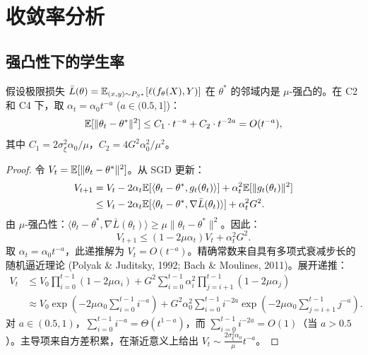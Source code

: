 \section{收敛率分析}\label{sec:rates}

\subsection{强凸性下的学生率}

\begin{theorem}[强凸性下的学生收敛率]\label{thm:rate-student}
假设极限损失 $\bar{L}(\theta) = \mathbb{E}_{(x,y) \sim P_{S^*}}[\ell(f_\theta(X), Y)]$ 在 $\theta^*$ 的邻域内是 $\mu$-强凸的。在 C2 和 C4 下，取 $\alpha_t = \alpha_0 t^{-a}$ ($a \in (0.5, 1]$)：
\begin{equation}
    \mathbb{E}[\|\theta_t - \theta^*\|^2] \leq C_1 \cdot t^{-a} + C_2 \cdot t^{-2a} = O(t^{-a}),
\end{equation}
其中 $C_1 = 2\sigma_\xi^2 \alpha_0 / \mu$，$C_2 = 4 G^2 \alpha_0^2 / \mu^2$。
\end{theorem}

\begin{proof}
令 $V_t = \mathbb{E}[\|\theta_t - \theta^*\|^2]$。从 SGD 更新：
\begin{align}
    V_{t+1} &= V_t - 2\alpha_t \mathbb{E}[\langle \theta_t - \theta^*, g_t(\theta_t) \rangle] + \alpha_t^2 \mathbb{E}[\|g_t(\theta_t)\|^2] \\
    &\leq V_t - 2\alpha_t \mathbb{E}[\langle \theta_t - \theta^*, \nabla \bar{L}(\theta_t) \rangle] + \alpha_t^2 G^2.
\end{align}
由 $\mu$-强凸性：$\langle \theta_t - \theta^*, \nabla \bar{L}(\theta_t) \rangle \geq \mu \|\theta_t - \theta^*\|^2$。因此：
\begin{equation}
    V_{t+1} \leq (1 - 2\mu\alpha_t) V_t + \alpha_t^2 G^2.
\end{equation}
取 $\alpha_t = \alpha_0 t^{-a}$，此递推解为 $V_t = O(t^{-a})$。精确常数来自具有多项式衰减步长的随机逼近理论 (Polyak \& Juditsky, 1992; Bach \& Moulines, 2011)。展开递推：
\begin{align}
    V_t &\leq V_0 \prod_{i=0}^{t-1} (1 - 2\mu\alpha_i) + G^2 \sum_{i=0}^{t-1} \alpha_i^2 \prod_{j=i+1}^{t-1} (1 - 2\mu\alpha_j) \\
    &\approx V_0 \exp\left(-2\mu \alpha_0 \sum_{i=0}^{t-1} i^{-a}\right) + G^2 \alpha_0^2 \sum_{i=0}^{t-1} i^{-2a} \exp\left(-2\mu \alpha_0 \sum_{j=i+1}^{t-1} j^{-a}\right).
\end{align}
对 $a \in (0.5, 1)$，$\sum_{i=0}^{t-1} i^{-a} = \Theta(t^{1-a})$，而 $\sum_{i=0}^{t-1} i^{-2a} = O(1)$（当 $a > 0.5$）。主导项来自方差积累，在渐近意义上给出 $V_t \sim \frac{2\sigma_\xi^2 \alpha_0}{\mu} t^{-a}$。
\end{proof}

